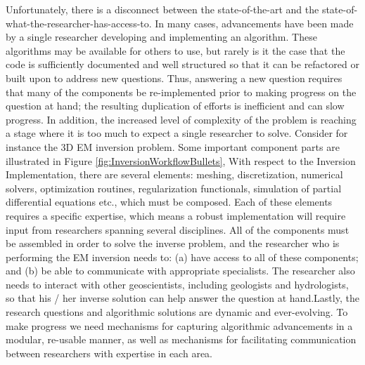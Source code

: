\documentclass[paper]{geophysics}
\begin{document}
Unfortunately, there is a disconnect between the state-of-the-art and the state-of-what-the-researcher-has-access-to. In many cases, advancements have been made by a single researcher developing and implementing an algorithm. These algorithms may be available for others to use, but rarely is it the case that the code is sufficiently documented and well structured so that it can be refactored or built upon to address new questions. Thus, answering a new question requires that many of the components be re-implemented prior to making progress on the question at hand; the resulting duplication of efforts is inefficient and can slow progress. In addition, the increased level of complexity of the problem is reaching a stage where it is too much to expect a single researcher to solve. Consider for instance the 3D EM inversion problem. Some important component parts are illustrated in Figure \ref{fig:InversionWorkflowBullets}, With respect to the Inversion Implementation, there are several elements: meshing, discretization, numerical solvers, optimization routines, regularization functionals, simulation of partial differential equations etc., which must be composed. Each of these elements requires a specific expertise, which means a robust implementation will require input from researchers spanning several disciplines. All of the components must be assembled in order to solve the inverse problem, and the researcher who is performing the EM inversion needs to: (a) have access to all of these components; and (b) be able to communicate with appropriate specialists. The researcher also needs to interact with other geoscientists, including geologists and hydrologists, so that his / her inverse solution can help answer the question at hand.Lastly,  the research questions and algorithmic solutions are dynamic and ever-evolving. To make progress we need mechanisms for capturing algorithmic advancements in a modular, re-usable manner, as well as mechanisms for facilitating communication between researchers with expertise in each area.
\end{document}
